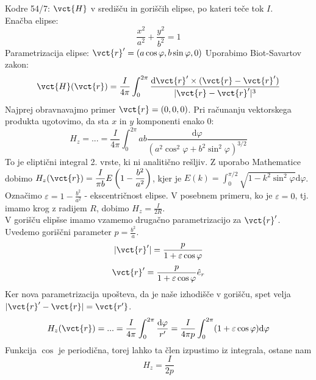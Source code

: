 \documentclass[a4paper]{article}
\newcommand{\dif}{\mathrm{d}}
\begin{document}
Kodre 54/7: $\vct{H}$ v središču in goriščih elipse, po kateri teče tok $I$. \\
Enačba elipse: $$\frac{x^2}{a^2} + \frac{y^2}{b^2} = 1$$
Parametrizacija elipse: $\displaystyle{\vct{r}' = (a\cos\varphi, b\sin\varphi, 0)}$
Uporabimo Biot-Savartov zakon:
$$\vct{H}(\vct{r}) = \frac{I}{4\pi}\int_{0}^{2\pi}\frac{\dif\vct{r}'\times(\vct{r} - \vct{r}')}{|\vct{r} - \vct{r}'|^3}$$
Najprej obravnavajmo primer $\vct{r} = (0, 0, 0)$. Pri računanju vektorskega produkta ugotovimo, da sta $x$ in $y$ komponenti enako 0:
$$H_z = ... = \frac{I}{4\pi}\int_{0}^{2\pi}ab\frac{\dif\varphi}{(a^2\cos^2\varphi + b^2\sin^2\varphi)^{3/2}}$$
To je eliptični integral 2. vrste, ki ni analitično rešljiv. Z uporabo Mathematice dobimo $\displaystyle{H_z(\vct{r}) = \frac{I}{\pi b} E\left(1 - \frac{b^2}{a^2}\right)}$, kjer je
$\displaystyle{E(k) = \int_{0}^{\pi/2} \sqrt{1 - k^2\sin^2\varphi}\dif\varphi}$.
Označimo $\displaystyle{\varepsilon = 1 - \frac{b^2}{a^2}}$ - ekscentričnost elipse.
V posebnem primeru, ko je $\varepsilon = 0$, tj. imamo krog z radijem $R$, dobimo $\displaystyle{H_z = \frac{I}{2R}}$. \\[3mm]
V gorišču elipšse imamo vzamemo drugačno parametrizacijo za $\vct{r}'$. Uvedemo goriščni parameter $\displaystyle{p = \frac{b^2}{a}}$.
$$|\vct{r}'| = \frac{p}{1 + \varepsilon\cos\varphi}$$
$$\vct{r}' = \frac{p}{1 + \varepsilon\cos\varphi}\hat{e}_r$$
Ker nova parametrizacija upošteva, da je naše izhodišče v gorišču, spet velja $|\vct{r}' - \vct{r}| = \vct{r'}$.
$$H_z(\vct{r}) = ... = \frac{I}{4\pi}\int_{0}^{2\pi} \frac{\dif\varphi}{r'} = \frac{I}{4\pi p} \int_{0}^{2\pi} (1 + \varepsilon \cos\varphi)\dif\varphi$$
Funkcija $\cos$ je periodična, torej lahko ta člen izpustimo iz integrala, ostane nam
$$H_z = \frac{I}{2p}$$
\end{document}
